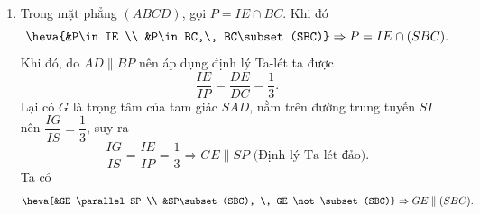 \begin{bt}
{\begin{enumerate}
			\item Trong mặt phẳng $(ABCD)$, gọi $P = IE\cap BC$. Khi đó\\
			$$\heva{&P\in IE \\ &P\in BC,\, BC\subset (SBC)} \Rightarrow P = IE \cap (SBC).$$ 
			Khi đó, do $AD \parallel BP$ nên áp dụng định lý Ta-lét ta được $$\dfrac{IE}{IP} = \dfrac{DE}{DC} = \dfrac{1}{3}.$$ 
			Lại có $G$ là trọng tâm của tam giác $SAD$, nằm trên đường trung tuyến $SI$ nên $\dfrac{IG}{IS} = \dfrac{1}{3}$, suy ra
			$$\dfrac{IG}{IS} = \dfrac{IE}{IP}=\dfrac{1}{3} \Rightarrow GE \parallel SP \text{ (Định lý Ta-lét đảo).}$$
			Ta có $$ \heva{&GE \parallel SP \\ &SP\subset (SBC), \, GE \not\subset (SBC)} \Rightarrow GE \parallel (SBC).$$
		\end{enumerate}
	}
\end{bt}

